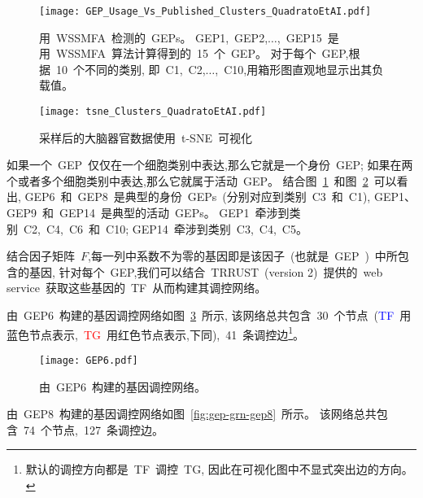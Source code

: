 \begin{figure}[!htbp]
    \centering
    \texttt{[image: GEP\_Usage\_Vs\_Published\_Clusters\_QuadratoEtAI.pdf]}
    \caption{
    用~WSSMFA~检测的~GEPs。
    GEP1,~GEP2,$\ldots$,~GEP15~是用~WSSMFA~算法计算得到的~15~个~GEP。
    对于每个~GEP,根据~10~个不同的类别,
    即~C1,~C2,$\ldots$,~C10,用箱形图直观地显示出其负载值。 
    }
    \label{fig:gep-gep}
\end{figure}


\begin{figure}[!htbp]
    \centering
    \texttt{[image: tsne\_Clusters\_QuadratoEtAI.pdf]}
    \caption{
    采样后的大脑器官数据使用~t-SNE~可视化
    }
    \label{fig:gep-tsne}
\end{figure}

如果一个~GEP~仅仅在一个细胞类别中表达,那么它就是一个身份~GEP;
如果在两个或者多个细胞类别中表达,那么它就属于活动~GEP。
结合图~\ref{fig:gep-gep}~和图~\ref{fig:gep-tsne}~可以看出, 
GEP6~和~GEP8~是典型的身份~GEPs~(分别对应到类别~C3~和~C1), GEP1、GEP9~和~GEP14~是典型的活动~GEPs。
GEP1~牵涉到类别~C2,~C4,~C6~和~C10; GEP14~牵涉到类别~C3,~C4,~C5。


结合因子矩阵~$F$,每一列中系数不为零的基因即是该因子~(也就是~GEP~)~中所包含的基因,
针对每个~GEP,我们可以结合~TRRUST~(version 2)~提供的~web service~获取这些基因的~TF~从而构建其调控网络。

由~GEP6~构建的基因调控网络如图~\ref{fig:gep-grn-gep6}~所示,
该网络总共包含~30~个节点~(\textcolor{blue}{TF}~用蓝色节点表示,~\textcolor{red}{TG}~用红色节点表示,下同),~41~条调控边\footnote{默认的调控方向都是~TF~调控~TG, 因此在可视化图中不显式突出边的方向。
}。
\begin{figure}[!htbp]
    \centering
    \texttt{[image: GEP6.pdf]}
    \caption{由~GEP6~构建的基因调控网络。}
    \label{fig:gep-grn-gep6}
\end{figure}

由~GEP8~构建的基因调控网络如图~\ref{fig:gep-grn-gep8}~所示。
该网络总共包含~74~个节点,~127~条调控边。

